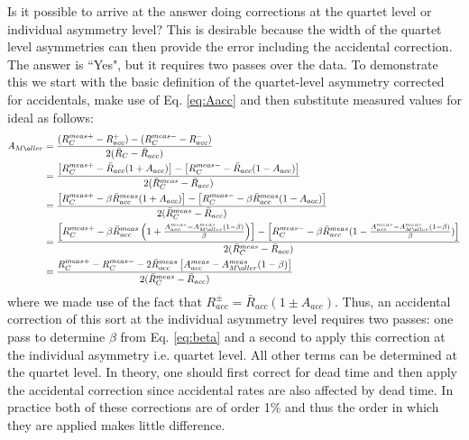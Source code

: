 \documentclass[12pt]{article}
\begin{document}
Is it possible to arrive at the answer doing corrections at the quartet level or individual asymmetry level? This is desirable because the width of the quartet level asymmetries can then provide the error including the accidental correction. The answer is ``Yes", but it requires two passes over the data. To demonstrate this we start with the basic definition of the quartet-level asymmetry corrected for accidentals, make use of Eq. \ref{eq:Aacc} and then substitute measured values for ideal as follows:
\begin{align}
A_{M\o ller}&=\frac{(R_C^{meas +}-R_{acc}^{+})-(R_C^{meas -}-R_{acc}^{-})}{2(\bar{R}_C-\bar{R}_{acc})}\\
&=\frac{\left[R_C^{meas +}-\bar{R}_{acc}(1+A_{acc})\right]-\left[R_C^{meas -}-\bar{R}_{acc}(1-A_{acc})\right]}{2(\bar{R}_C^{meas}-\bar{R}_{acc})}\\
&=\frac{\left[R_C^{meas +}-\beta\bar{R}_{acc}^{meas}(1+A_{acc})\right]-\left[R_C^{meas -}-\beta\bar{R}_{acc}^{meas}(1-A_{acc})\right]}{2(\bar{R}_C^{meas}-\bar{R}_{acc})}\\
&=\frac{\left[R_C^{meas +}-\beta\bar{R}_{acc}^{meas}\left(1+\frac{A_{acc}^{meas}-A_{M\o ller}^{meas}(1-\beta)}{\beta}\right)\right]-\left[R_C^{meas -}-\beta\bar{R}_{acc}^{meas}(1-\frac{A_{acc}^{meas}-A_{M\o ller}^{meas}(1-\beta)}{\beta})\right]}{2(\bar{R}_C^{meas}-\bar{R}_{acc})}\\
&=\frac{R_C^{meas +}-R_C^{meas -}-2\bar{R}_{acc}^{meas}\left[A_{acc}^{meas}-A_{M\o ller}^{meas}(1-\beta)\right]}{2(\bar{R}_C^{meas}-\bar{R}_{acc})}
\end{align}
where we made use of the fact that $R_{acc}^{\pm}=\bar{R}_{acc}(1\pm A_{acc})$. Thus, an accidental correction of this sort at the individual asymmetry level requires two passes: one pass to determine $\beta$ from Eq. \ref{eq:beta} and a second to apply this correction at the individual asymmetry i.e. quartet level.  All other terms can be determined at the quartet level. In theory, one should first correct for dead time and then apply the accidental correction since accidental rates are also affected by dead time. In practice both of these corrections are of order 1\% and thus the order in which they are applied makes little difference. 
\end{document}
